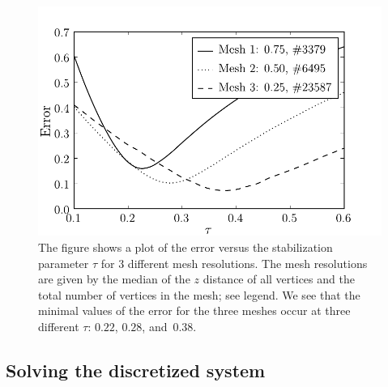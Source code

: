 \begin{figure}
  \centering
  \includegraphics[width=\largefig]{chapters/hake/pdf/error_plot}
  \caption[Error plot]{The figure shows a plot of the error versus the
    stabilization parameter $\tau$ for 3 different mesh
    resolutions. The mesh resolutions are given by the median of the
    $z$ distance of all vertices and the total number of vertices in
    the mesh; see legend. We see that the minimal values of the error
    for the three meshes occur at three different $\tau$: $0.22$, $0.28$,
    and~$0.38$.}
  \label{fig:hake:error_plot}
\end{figure}

\subsection{Solving the discretized system}

